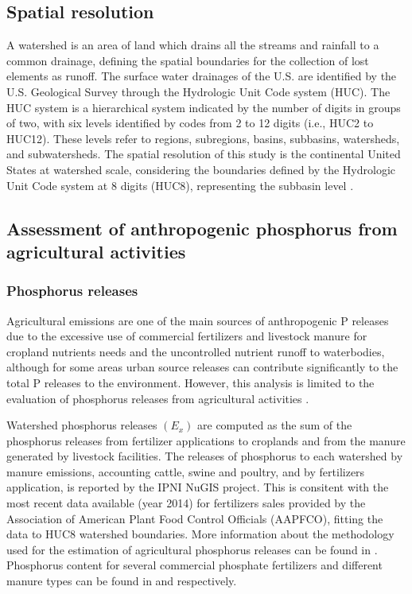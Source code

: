 \begin{refsection}[referencesCh3]
\subsection{Spatial resolution}
A watershed is an area of land which drains all the streams and rainfall to a common drainage, defining the spatial boundaries for the collection of lost elements as runoff. The surface  water  drainages of the U.S. are identified by the U.S. Geological Survey through the Hydrologic Unit Code system (HUC). The HUC system is a hierarchical system indicated by the number of digits in groups of two, with six levels identified by codes from 2 to 12 digits (i.e., HUC2 to HUC12). These levels refer to regions, subregions, basins, subbasins, watersheds, and subwatersheds. The spatial resolution of this study is the continental United States at watershed scale, considering the boundaries defined by the Hydrologic Unit Code system at 8 digits (HUC8), representing the subbasin level \citep{HUC8}.

\subsection{Assessment of anthropogenic phosphorus from agricultural activities}
\subsubsection{Phosphorus releases} \label{Preleases}
Agricultural emissions are one of the main sources of anthropogenic P releases due to the excessive use of commercial fertilizers and livestock manure for cropland nutrients needs and the uncontrolled nutrient runoff to waterbodies, although for some areas urban source releases can contribute significantly to the total P releases to the environment. However, this analysis is limited to the evaluation of phosphorus releases from agricultural activities \citep{Dzombak, Alexander_2008, SPARROW_report_1999}.

Watershed phosphorus releases $\left(E_{x}\right)$ are computed as the sum of the phosphorus releases from fertilizer applications to croplands and from the manure generated by livestock facilities. The releases of phosphorus to each watershed by manure emissions, accounting cattle, swine and poultry, and by fertilizers application, is reported by the IPNI NuGIS project. This is consitent with the most recent data available (year 2014) for fertilizers sales provided by the Association of American Plant Food Control Officials (AAPFCO), fitting the data to HUC8 watershed boundaries. More information about the methodology used for the estimation of agricultural phosphorus releases can be found in \citep{NuGIS}. Phosphorus content for several commercial phosphate fertilizers and different manure types can be found in \citet{OSU2017} and \citet{OSU2005} respectively.


\end{refsection}
